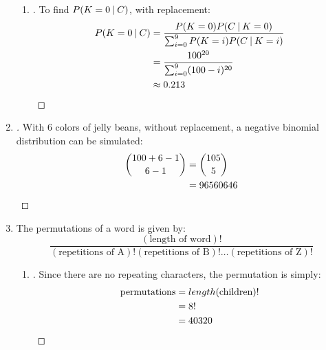 \documentclass[paper=usletter, fontsize=12pt]{article}
\begin{document}
\begin{enumerate}
\begin{enumerate}
                \item
                \begin{proof}[\unskip\nopunct]
                    To find $P(K=0 \:\vert\: C)$, with replacement:
                    \begingroup
                    \addtolength{\jot}{1em}
                    \begin{align*}
                        P(K=0 \:\vert\: C) & = \frac{P(K=0)P(C \:\vert\: K=0)}{\sum_{i=0}^{9}P(K=i)P(C \:\vert\: K=i)} \\
                        & = \frac{100^{20}}{\sum_{i=0}^{9}(100-i)^{20}}\\
                        & \approx 0.213 \qedhere
                    \end{align*}
                    \endgroup
                \end{proof}
                \vspace{0.2in}

            \end{enumerate}

        \item
        \begin{proof}[\unskip\nopunct]
            With 6 colors of jelly beans, without replacement, a negative binomial distribution can be simulated:
            \begin{align*}
                \binom{100+6-1}{6-1} & = \binom{105}{5} \\
                & = 96560646 \qedhere
            \end{align*}
        \end{proof}
        \vspace{0.2in}

        \item
        The permutations of a word is given by:
        \begin{equation*}
            \frac{(\text{length of word})!}{(\text{repetitions of A})!(\text{repetitions of B})!\ldots (\text{repetitions of Z})!}
        \end{equation*}
        \begin{enumerate}

            \item
            \begin{proof}[\unskip\nopunct]
                Since there are no repeating characters, the permutation is
                simply:
                \begingroup
                \addtolength{\jot}{1em}
                \begin{align*}
                    \text{permutations} & = length(\text{children})! \\
                    & = 8! \\
                    & = 40320 \qedhere
                \end{align*}
                \endgroup
            \end{proof}
            \vspace{0.2in}


\end{enumerate}
\end{enumerate}
\end{document}
